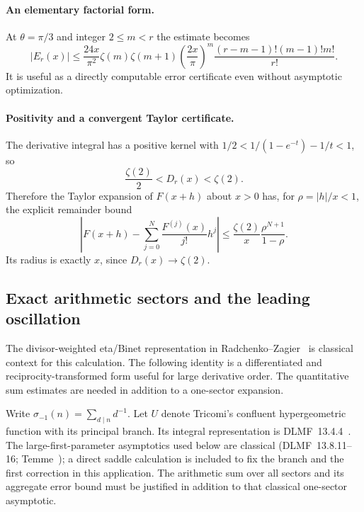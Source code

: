 \paragraph{An elementary factorial form.}
At $\theta=\pi/3$ and integer $2\le m<r$ the estimate becomes
\[
 |E_r(x)|\le \frac{24x}{\pi^2}\zeta(m)\zeta(m+1)
 \left(\frac{2x}{\pi}\right)^m
 \frac{(r-m-1)!(m-1)!m!}{r!}.
\]
It is useful as a directly computable error certificate even without
asymptotic optimization.

\paragraph{Positivity and a convergent Taylor certificate.}
The derivative integral has a positive kernel with
$1/2<1/(1-e^{-t})-1/t<1$, so
\[
 \frac{\zeta(2)}2<D_r(x)<\zeta(2).
\]
Therefore the Taylor expansion of $F(x+h)$ about $x>0$ has, for
$\rho=|h|/x<1$, the explicit remainder bound
\[
 \left|F(x+h)-\sum_{j=0}^{N}\frac{F^{(j)}(x)}{j!}h^j\right|
 \le\frac{\zeta(2)}x\frac{\rho^{N+1}}{1-\rho}.
\]
Its radius is exactly $x$, since $D_r(x)\to\zeta(2)$.

\subsection{Exact arithmetic sectors and the leading oscillation}

The divisor-weighted eta/Binet representation in Radchenko--Zagier~\cite[Section~7.3]{RadchenkoZagier} is classical context for this calculation. The following identity is a differentiated and reciprocity-transformed form useful for large derivative order. The quantitative sum estimates are needed in addition to a one-sector expansion.


Write $\sigma_{-1}(n)=\sum_{d\mid n}d^{-1}$. Let $U$ denote Tricomi's
confluent hypergeometric function with its principal branch. Its integral
representation is DLMF~13.4.4~\cite{hergjet:DLMF}. The large-first-parameter asymptotics used
below are classical (DLMF~13.8.11--16; Temme~\cite{hergjet:Temme}); a direct saddle calculation
is included to fix the branch and the first correction in this application.
The arithmetic sum over all sectors and its aggregate error bound must be
justified in addition to that classical one-sector asymptotic.

